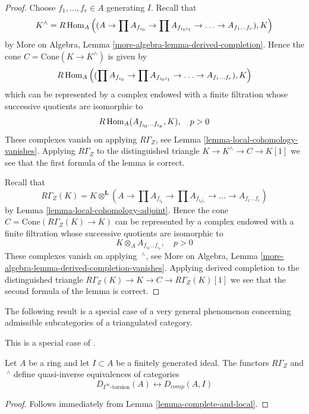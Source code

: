 \begin{proof}
Choose $f_1, \ldots, f_r \in A$ generating $I$. Recall that
$$
K^\wedge = R\mathop{\mathrm{Hom}}\nolimits_A\left((A \to \prod A_{f_{i_0}}
\to \prod A_{f_{i_0i_1}} \to \ldots \to A_{f_1 \ldots f_r}), K\right)
$$
by More on Algebra, Lemma \ref{more-algebra-lemma-derived-completion}.
Hence the cone $C = \text{Cone}(K \to K^\wedge)$
is given by
$$
R\mathop{\mathrm{Hom}}\nolimits_A\left((\prod A_{f_{i_0}}
\to \prod A_{f_{i_0i_1}} \to \ldots \to A_{f_1 \ldots f_r}), K\right)
$$
which can be represented by a complex endowed with a finite filtration
whose successive quotients are isomorphic to
$$
R\mathop{\mathrm{Hom}}\nolimits_A(A_{f_{i_0} \ldots f_{i_p}}, K), \quad p > 0
$$
These complexes vanish on applying $R\Gamma_Z$, see
Lemma \ref{lemma-local-cohomology-vanishes}. Applying $R\Gamma_Z$
to the distinguished triangle $K \to K^\wedge \to C \to K[1]$
we see that the first formula of the lemma is correct.

\medskip\noindent
Recall that
$$
R\Gamma_Z(K) =
K \otimes^\mathbf{L} (A \to \prod A_{f_{i_0}}
\to \prod A_{f_{i_0i_1}} \to \ldots \to A_{f_1 \ldots f_r})
$$
by Lemma \ref{lemma-local-cohomology-adjoint}.
Hence the cone $C = \text{Cone}(R\Gamma_Z(K) \to K)$
can be represented by a complex endowed with a finite filtration
whose successive quotients are isomorphic to
$$
K \otimes_A A_{f_{i_0} \ldots f_{i_p}}, \quad p > 0
$$
These complexes vanish on applying ${\ }^\wedge$, see
More on Algebra, Lemma \ref{more-algebra-lemma-derived-completion-vanishes}.
Applying derived completion to the distinguished triangle
$R\Gamma_Z(K) \to K \to C \to R\Gamma_Z(K)[1]$
we see that the second formula of the lemma is correct.
\end{proof}

\noindent
The following result is a special case of a very general phenomenon
concerning admissible subcategories of a triangulated category.

\begin{proposition}
\label{proposition-torsion-complete}
\begin{reference}
This is a special case of \cite[Theorem 1.1]{Porta-Liran-Yekutieli}.
\end{reference}
Let $A$ be a ring and let $I \subset A$ be a finitely generated ideal.
The functors $R\Gamma_Z$ and ${\ }^\wedge$
define quasi-inverse equivalences of categories
$$
D_{I^\infty\text{-torsion}}(A) \leftrightarrow D_{comp}(A, I)
$$
\end{proposition}

\begin{proof}
Follows immediately from Lemma \ref{lemma-complete-and-local}.
\end{proof}

